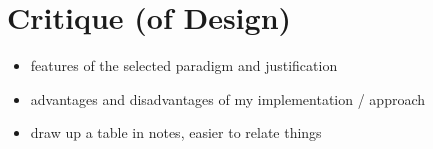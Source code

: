 \section{Critique (of Design)}
\begin{itemize}
	\item features of the selected paradigm and justification
	\item advantages and disadvantages of my implementation / approach
	\item draw up a table in notes, easier to relate things
\end{itemize}
